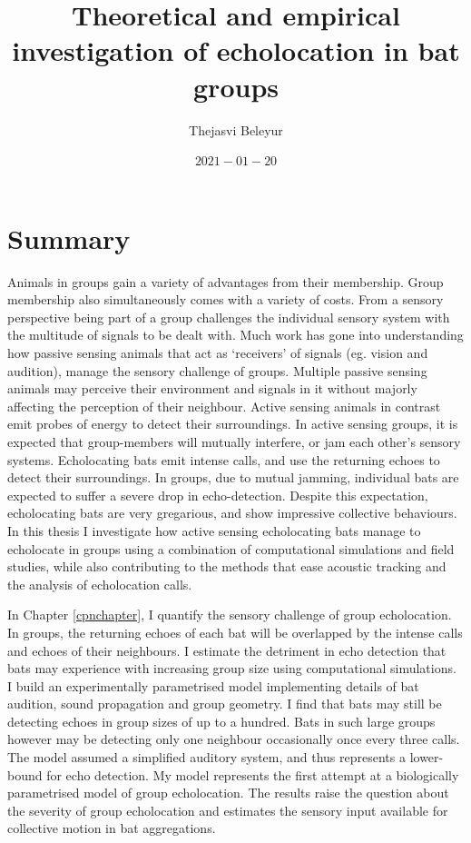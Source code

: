 \documentclass[
]{book}
\title{Theoretical and empirical investigation of echolocation in bat groups}
\author{Thejasvi Beleyur}
\date{\(2021-01-20\)}
\begin{document}
\maketitle

{
\setcounter{tocdepth}{1}
\tableofcontents
}
\hypertarget{summary}{%
\chapter*{Summary}\label{summary}}

Animals in groups gain a variety of advantages from their membership. Group membership also simultaneously comes with a variety of costs. From a sensory perspective being part of a group challenges the individual sensory system with the multitude of signals to be dealt with. Much work has gone into understanding how passive sensing animals that act as `receivers' of signals (eg. vision and audition), manage the sensory challenge of groups. Multiple passive sensing animals may perceive their environment and signals in it without majorly affecting the perception of their neighbour. Active sensing animals in contrast emit probes of energy to detect their surroundings. In active sensing groups, it is expected that group-members will mutually interfere, or jam each other's sensory systems. Echolocating bats emit intense calls, and use the returning echoes to detect their surroundings. In groups, due to mutual jamming, individual bats are expected to suffer a severe drop in echo-detection. Despite this expectation, echolocating bats are very gregarious, and show impressive collective behaviours. In this thesis I investigate how active sensing echolocating bats manage to echolocate in groups using a combination of computational simulations and field studies, while also contributing to the methods that ease acoustic tracking and the analysis of echolocation calls.

In Chapter \ref{cpnchapter}, I quantify the sensory challenge of group echolocation. In groups, the returning echoes of each bat will be overlapped by the intense calls and echoes of their neighbours. I estimate the detriment in echo detection that bats may experience with increasing group size using computational simulations. I build an experimentally parametrised model implementing details of bat audition, sound propagation and group geometry. I find that bats may still be detecting echoes in group sizes of up to a hundred. Bats in such large groups however may be detecting only one neighbour occasionally once every three calls. The model assumed a simplified auditory system, and thus represents a lower-bound for echo detection. My model represents the first attempt at a biologically parametrised model of group echolocation. The results raise the question about the severity of group echolocation and estimates the sensory input available for collective motion in bat aggregations.
\end{document}
